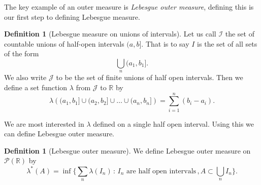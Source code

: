 \documentclass[11pt]{article}
\theoremstyle{definition}
\newtheorem{dfn}[thm]{Definition}
\theoremstyle{remark}
\begin{document}
The key example of an outer measure is \emph{Lebesgue outer measure}, defining this is our first step to defining Lebesgue measure.
\begin{dfn}[Lebesgue measure on unions of intervals]
Let us call $\mathcal{I}$ the set of countable unions of half-open intervals $(a,b]$. That is to say $I$ is the set of all sets of the form
\[ \bigcup_n (a_1,b_1]. \]  We also write $\mathcal{J}$ to be the set of finite unions of half open intervals. Then we define a set function $\lambda$ from $\mathcal{J}$ to $\mathbb{R}$ by
\[ \lambda \left(  (a_1, b_1] \cup (a_2,b_2] \cup \dots \cup (a_n,b_n] \right) = \sum_{i=1}^n (b_i-a_i).\]
\end{dfn}
We are most interested in $\lambda$ defined on a single half open interval. 
Using this we can define Lebesgue outer measure.
\begin{dfn}[Lebesgue outer measure]
We define Lebesgue outer measure on $\mathscr{P}(\mathbb{R})$ by 
\[ \lambda^* (A) = \inf \{ \sum_n\lambda (I_n) \, : \, \mbox{$I_n$ are half open intervals}\, , A \subset \bigcup_n I_n\}. \]
\end{dfn}
\end{document}
